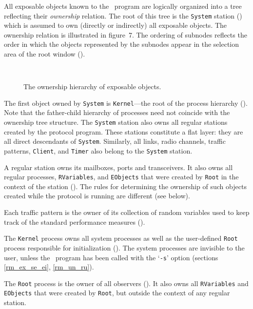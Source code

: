 All exposable objects known to the \smurph\ program are logically organized
into a tree reflecting their {\em ownership\/} relation.
The root of this tree is the {\tt System} station ()
which is assumed to own (directly or indirectly) all exposable objects.
The ownership relation is illustrated in
figure~7.
The ordering of subnodes reflects the order in which the objects represented
by the subnodes appear in the selection area of the root window
().

\begin{figure}
\begin{center}
\ 
\caption{The ownership hierarchy of exposable objects.}%
\end{center}
\end{figure}

The first object owned by {\tt System} is {\tt Kernel}---the root
of the process hierarchy ().
Note that the father-child hierarchy of processes
need not coincide with the ownership tree structure.
The {\tt System} station also owns all regular stations created by the 
protocol program.
These stations constitute a flat layer: they are all direct descendants
of {\tt System}.
Similarly, all links, radio channels,
traffic patterns, {\tt Client}, and {\tt Timer}
also belong to the {\tt System} station.

A regular station owns its mailboxes, ports and transceivers.
It also owns all regular processes, {\tt RVariables}, and {\tt EObjects}
that were created by {\tt Root}
in the context of the station ().
The rules for determining the ownership of such objects created
while the protocol is running are different (see below).

Each traffic pattern is the owner of its collection of random variables
used
to keep track of the standard performance measures ().

The {\tt Kernel} process owns all system processes as well as 
the user-defined {\tt Root} process responsible
for initialization ().
The system processes are invisible to the user,
unless the \smurph\ program has been
called with the `{\tt -s}' option (sections \ref{rm_ex_se_ei}, \ref{rm_un_ru}).

The {\tt Root} process is the owner of all observers ().
It also owns all
{\tt RVariables} and {\tt EObjects} that were created by
{\tt Root}, but outside the context of any regular station.

